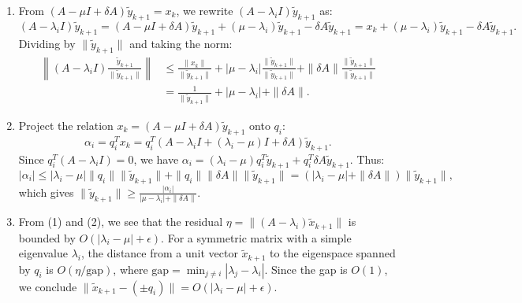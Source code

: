\begin{solution}
\begin{enumerate}
    \item[(1)] From $(A - \mu I + \delta A) \tilde{y}_{k+1} = x_k$, we rewrite $(A - \lambda_i I) \tilde{y}_{k+1}$ as:
    \[ (A - \lambda_i I) \tilde{y}_{k+1} = (A - \mu I + \delta A) \tilde{y}_{k+1} + (\mu - \lambda_i) \tilde{y}_{k+1} - \delta A \tilde{y}_{k+1} = x_k + (\mu - \lambda_i) \tilde{y}_{k+1} - \delta A \tilde{y}_{k+1}. \]
    Dividing by $\|\tilde{y}_{k+1}\|$ and taking the norm:
    \begin{align*}
        \left\| (A - \lambda_i I) \frac{\tilde{y}_{k+1}}{\|\tilde{y}_{k+1}\|} \right\| &\leq \frac{\|x_k\|}{\|\tilde{y}_{k+1}\|} + |\mu - \lambda_i| \frac{\|\tilde{y}_{k+1}\|}{\|\tilde{y}_{k+1}\|} + \|\delta A\| \frac{\|\tilde{y}_{k+1}\|}{\|\tilde{y}_{k+1}\|} \\
        &= \frac{1}{\|\tilde{y}_{k+1}\|} + |\mu - \lambda_i| + \|\delta A\|.
    \end{align*}
    
    \item[(2)] Project the relation $x_k = (A - \mu I + \delta A) \tilde{y}_{k+1}$ onto $q_i$:
    \[ \alpha_i = q_i^T x_k = q_i^T (A - \lambda_i I + (\lambda_i - \mu) I + \delta A) \tilde{y}_{k+1}. \]
    Since $q_i^T (A - \lambda_i I) = 0$, we have $\alpha_i = (\lambda_i - \mu) q_i^T \tilde{y}_{k+1} + q_i^T \delta A \tilde{y}_{k+1}$. Thus:
    \[ |\alpha_i| \leq |\lambda_i - \mu| \|q_i\| \|\tilde{y}_{k+1}\| + \|q_i\| \|\delta A\| \|\tilde{y}_{k+1}\| = (|\lambda_i - \mu| + \|\delta A\|) \|\tilde{y}_{k+1}\|, \]
    which gives $\|\tilde{y}_{k+1}\| \geq \frac{|\alpha_i|}{|\mu - \lambda_i| + \|\delta A\|}$.
    
    \item[(3)] From (1) and (2), we see that the residual $\eta = \|(A - \lambda_i) \tilde{x}_{k+1}\|$ is bounded by $O(|\lambda_i - \mu| + \epsilon)$. For a symmetric matrix with a simple eigenvalue $\lambda_i$, the distance from a unit vector $\tilde{x}_{k+1}$ to the eigenspace spanned by $q_i$ is $O(\eta / \text{gap})$, where $\text{gap} = \min_{j \neq i} |\lambda_j - \lambda_i|$. Since the gap is $O(1)$, we conclude $\|\tilde{x}_{k+1} - (\pm q_i)\| = O(|\lambda_i - \mu| + \epsilon)$.
\end{enumerate}
\end{solution}

